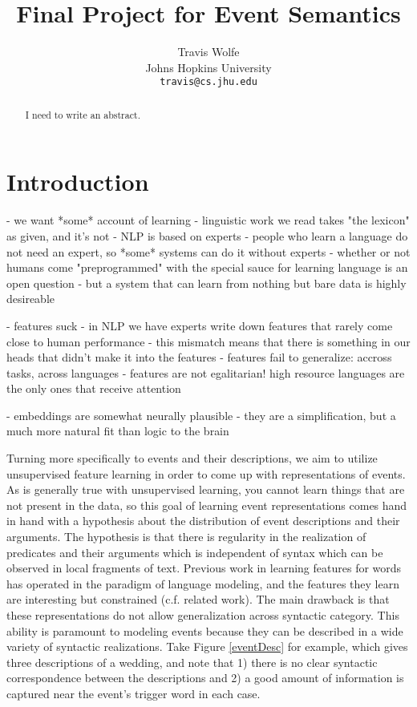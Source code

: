 \documentclass[11pt,letterpaper]{article}
\title{Final Project for Event Semantics}
\author{Travis Wolfe\\
	    Johns Hopkins University \\
	    {\tt travis@cs.jhu.edu}
}
\date{}
\begin{document}
\maketitle
\begin{abstract}
  I need to write an abstract.
\end{abstract}



\section{Introduction}
- we want *some* account of learning
	- linguistic work we read takes "the lexicon" as given, and it's not
	- NLP is based on experts
	- people who learn a language do not need an expert, so *some* systems can do it without experts
	- whether or not humans come "preprogrammed" with the special sauce for learning language is an open question
	- but a system that can learn from nothing but bare data is highly desireable

- features suck
	- in NLP we have experts write down features that rarely come close to human performance
	- this mismatch means that there is something in our heads that didn't make it into the features
	- features fail to generalize: accross tasks, across languages
	- features are not egalitarian! high resource languages are the only ones that receive attention

- embeddings are somewhat neurally plausible
	- they are a simplification, but a much more natural fit than logic to the brain

Turning more specifically to events and their descriptions,
we aim to utilize unsupervised feature learning in order to
come up with representations of events.
As is generally true with unsupervised learning, you cannot learn
things that are not present in the data, so this goal of learning event
representations comes hand in hand with a hypothesis about the
distribution of event descriptions and their arguments.
The hypothesis is that there is regularity in the realization of predicates
and their arguments which is independent of syntax which can be observed
in local fragments of text.
Previous work in learning features for words has operated in the
paradigm of language modeling, and the features they learn are
interesting but constrained (c.f. related work).
The main drawback is that these representations do not allow generalization
across syntactic category.
This ability is paramount to modeling events because they can be described
in a wide variety of syntactic realizations.
Take Figure \ref{eventDesc} for example, which gives three descriptions of a wedding,
and note that
1) there is no clear syntactic correspondence between the descriptions
and 2) a good amount of information is captured near the event's trigger word in each case.
\end{document}
